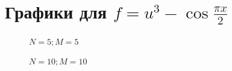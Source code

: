 \documentclass[12pt]{extarticle}
\numberwithin{equation}{section}
\begin{document}
\section{Графики для $f=u^3 - \cos \frac{\pi x}{2}$} 
\begin{figure}[H]
\begin{minipage}[h]{0.43\linewidth}
 $N=5; M=5$ \\
\end{minipage}
\hfill
\begin{minipage}[h]{0.43\linewidth}
 $N=10; M=10$ \\
\end{minipage}
\end{figure}
\end{document}

